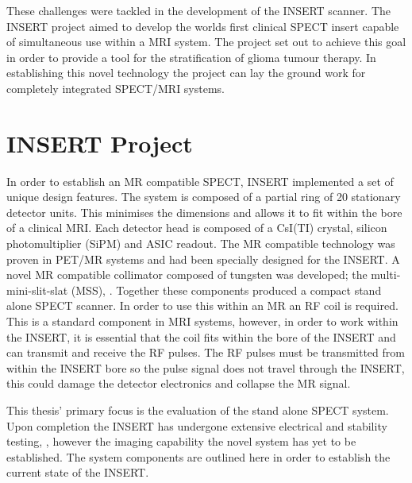 These challenges were tackled in the development of the \acrshort{INSERT} scanner. The \acrshort{INSERT} project aimed to develop the worlds first clinical \acrshort{SPECT} insert capable of simultaneous use within a \acrshort{MRI} system. The project set out to achieve this goal in order to provide a tool for the stratification of glioma tumour therapy. In establishing this novel technology the project can lay the ground work for completely integrated \acrshort{SPECT/MRI} systems.

\section{INSERT Project}

In order to establish an \acrshort{MR} compatible \acrshort{SPECT}, \acrshort{INSERT} implemented a set of unique design features. The system is composed of a partial ring of 20 stationary detector units. This minimises the dimensions and allows it to fit within the bore of a clinical \acrshort{MRI}. Each detector head is composed of a CsI(TI) crystal, silicon photomultiplier (SiPM) and ASIC readout. The \acrshort{MR} compatible technology was proven in \acrshort{PET/MR} systems and had been specially designed for the \acrshort{INSERT}. A novel \acrshort{MR} compatible collimator composed of tungsten was developed; the multi-mini-slit-slat (MSS), \cite{7430894}. Together these components produced a compact stand alone \acrshort{SPECT} scanner. In order to use this within an \acrshort{MR} an \acrlong{RF} coil is required. This is a standard component in \acrshort{MRI} systems, however, in order to work within the \acrshort{INSERT}, it is essential that the coil fits within the bore of the \acrshort{INSERT} and can transmit and receive the \acrshort{RF} pulses. The \acrshort{RF} pulses must be transmitted from within the \acrshort{INSERT} bore so the pulse signal does not travel through the \acrshort{INSERT}, this could damage the detector electronics and collapse the \acrshort{MR} signal.

This thesis' primary focus is the evaluation of the stand alone \acrshort{SPECT} system. Upon completion the \acrshort{INSERT} has undergone extensive electrical and stability testing, \cite{Marco}, however the imaging capability the novel system has yet to be established. The system components are outlined here in order to establish the current state of the \acrshort{INSERT}.

